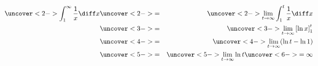 \begin{frame}
\begin{example}
\begin{columns}[c]
%
\begin{eqnarray*}
\uncover<2->{%
\int_1^\infty \frac{1}{x}\diff x%
}%
& \uncover<2->{ = } & %
\uncover<2->{%
\lim_{t\rightarrow \infty} \int_1^t \frac{1}{x}\diff x%
}\\%
& \uncover<3->{ = } & %
\uncover<3->{%
\lim_{t\rightarrow \infty} \left[ \ln x\right]_1^t%
}\\%
& \uncover<4->{ = } & %
\uncover<4->{%
\lim_{t\rightarrow \infty} (\ln t - \ln 1)%
}\\%
& \uncover<5->{ = } & %
\uncover<5->{%
\lim_{t\rightarrow \infty} \ln t%
}%
\uncover<6->{ = \infty }%
\end{eqnarray*}
\end{columns}
\end{example}
\end{frame}
